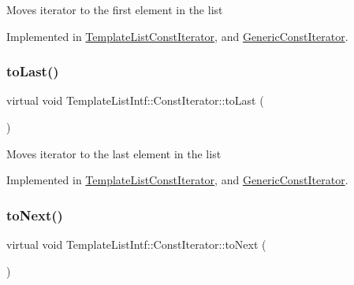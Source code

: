 Moves iterator to the first element in the list 

Implemented in \mbox{\hyperlink{class_template_list_const_iterator_aa0478c27f8d663f5fb09a89b6875cec5}{Template\+List\+Const\+Iterator}}, and \mbox{\hyperlink{class_generic_const_iterator_abb4c60f119f4ad23523b96080cfabd3e}{Generic\+Const\+Iterator}}.

\mbox{\label{class_template_list_intf_1_1_const_iterator_acf5b37615cb4544e1b0cb5717a127900}} 
\subsubsection{\texorpdfstring{toLast()}{toLast()}}
{\footnotesize\ttfamily virtual void Template\+List\+Intf\+::\+Const\+Iterator\+::to\+Last (\begin{DoxyParamCaption}{ }\end{DoxyParamCaption})\hspace{0.3cm}{\ttfamily [pure virtual]}}

Moves iterator to the last element in the list 

Implemented in \mbox{\hyperlink{class_template_list_const_iterator_abe543d04737d13d0dbdec99b4019f036}{Template\+List\+Const\+Iterator}}, and \mbox{\hyperlink{class_generic_const_iterator_a53787d6c70cff35f1edb8b3ced0530aa}{Generic\+Const\+Iterator}}.

\mbox{\label{class_template_list_intf_1_1_const_iterator_a8656b1ee10ba2625ba91eadb78f8faf7}} 
\subsubsection{\texorpdfstring{toNext()}{toNext()}}
{\footnotesize\ttfamily virtual void Template\+List\+Intf\+::\+Const\+Iterator\+::to\+Next (\begin{DoxyParamCaption}{ }\end{DoxyParamCaption})\hspace{0.3cm}{\ttfamily [pure virtual]}}

